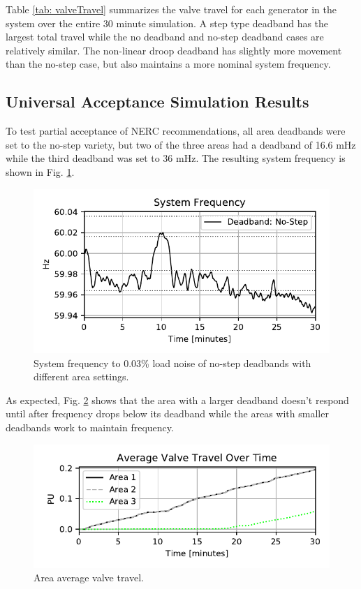 Table \ref{tab: valveTravel} summarizes the valve travel for each generator in the system over the entire 30 minute simulation. A step type deadband has the largest total travel while the no deadband and no-step deadband cases are relatively similar.
The non-linear droop deadband has slightly more movement than the no-step case, but also maintains a more nominal system frequency.




\subsection{Universal Acceptance Simulation Results}
To test partial acceptance of NERC recommendations, all area deadbands were set to the no-step variety, but two of the three areas had a deadband of 16.6 mHz while the third deadband was set to 36 mHz.
The resulting system frequency is shown in Fig. \ref{fig: uniFreq}.

\begin{figure}[!ht]
\centering
\includegraphics[width=\linewidth]{figures/miniWECCuniAccFreq}
\caption{System frequency to 0.03\% load noise of no-step deadbands with different area settings.}
\label{fig: uniFreq}
\end{figure}

As expected, Fig. \ref{fig: areaValveTravel} shows that the area with a larger deadband doesn't respond until after frequency drops below its deadband while the areas with smaller deadbands work to maintain frequency.
\begin{figure}[!ht]
\centering
\includegraphics[width=\linewidth]{figures/miniWECCuniAccVTOverTime}
\caption{Area average valve travel.}
\label{fig: areaValveTravel}
\end{figure}